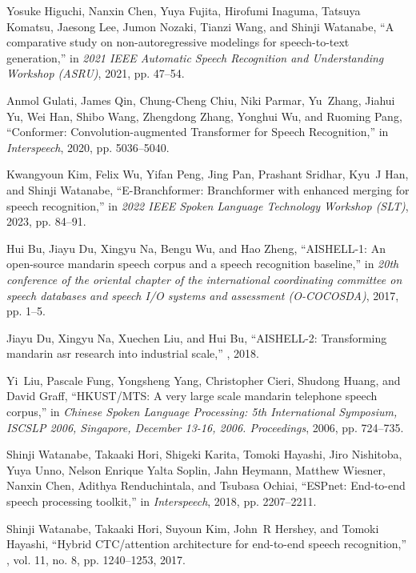 \documentclass{article}
\begin{document}
\begin{thebibliography}{10}
Yosuke Higuchi, Nanxin Chen, Yuya Fujita, Hirofumi Inaguma, Tatsuya Komatsu,
  Jaesong Lee, Jumon Nozaki, Tianzi Wang, and Shinji Watanabe,
\newblock ``A comparative study on non-autoregressive modelings for
  speech-to-text generation,''
\newblock in {\em 2021 IEEE Automatic Speech Recognition and Understanding
  Workshop (ASRU)}, 2021, pp. 47--54.

Anmol Gulati, James Qin, Chung-Cheng Chiu, Niki Parmar, Yu~Zhang, Jiahui Yu,
  Wei Han, Shibo Wang, Zhengdong Zhang, Yonghui Wu, and Ruoming Pang,
\newblock ``{Conformer: Convolution-augmented Transformer for Speech
  Recognition},''
\newblock in {\em Interspeech}, 2020, pp. 5036--5040.

Kwangyoun Kim, Felix Wu, Yifan Peng, Jing Pan, Prashant Sridhar, Kyu~J Han, and
  Shinji Watanabe,
\newblock ``{E-Branchformer}: Branchformer with enhanced merging for speech
  recognition,''
\newblock in {\em 2022 IEEE Spoken Language Technology Workshop (SLT)}, 2023,
  pp. 84--91.

Hui Bu, Jiayu Du, Xingyu Na, Bengu Wu, and Hao Zheng,
\newblock ``{AISHELL-1}: An open-source mandarin speech corpus and a speech
  recognition baseline,''
\newblock in {\em 20th conference of the oriental chapter of the international
  coordinating committee on speech databases and speech I/O systems and
  assessment (O-COCOSDA)}, 2017, pp. 1--5.

Jiayu Du, Xingyu Na, Xuechen Liu, and Hui Bu,
\newblock ``{AISHELL-2}: Transforming mandarin asr research into industrial
  scale,''
, 2018.

Yi~Liu, Pascale Fung, Yongsheng Yang, Christopher Cieri, Shudong Huang, and
  David Graff,
\newblock ``{HKUST/MTS}: A very large scale mandarin telephone speech corpus,''
\newblock in {\em Chinese Spoken Language Processing: 5th International
  Symposium, ISCSLP 2006, Singapore, December 13-16, 2006. Proceedings}, 2006,
  pp. 724--735.

Shinji Watanabe, Takaaki Hori, Shigeki Karita, Tomoki Hayashi, Jiro Nishitoba,
  Yuya Unno, Nelson {Enrique Yalta Soplin}, Jahn Heymann, Matthew Wiesner,
  Nanxin Chen, Adithya Renduchintala, and Tsubasa Ochiai,
\newblock ``{ESPnet}: End-to-end speech processing toolkit,''
\newblock in {\em Interspeech}, 2018, pp. 2207--2211.

Shinji Watanabe, Takaaki Hori, Suyoun Kim, John~R Hershey, and Tomoki Hayashi,
\newblock ``Hybrid {CTC/attention} architecture for end-to-end speech
  recognition,''
, vol. 11,
  no. 8, pp. 1240--1253, 2017.


\end{thebibliography}
\end{document}
